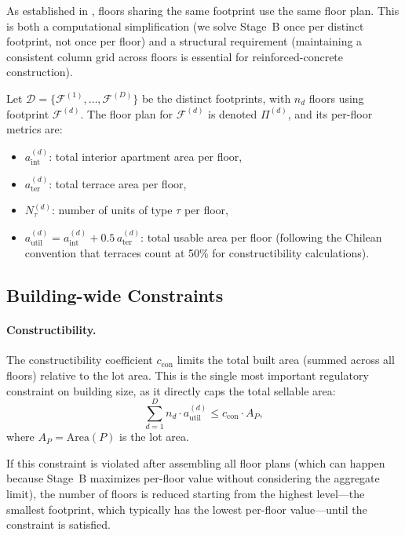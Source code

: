 \documentclass[11pt,a4paper]{article}
\newcommand{\calF}{\mathcal{F}}
\begin{document}
As established in , floors sharing the same footprint
use the same floor plan. This is both a computational simplification
(we solve Stage~B once per distinct footprint, not once per floor) and
a structural requirement (maintaining a consistent column grid across
floors is essential for reinforced-concrete construction).

Let $\mathcal{D} = \{\calF^{(1)}, \ldots, \calF^{(D)}\}$ be the distinct
footprints, with $n_d$ floors using footprint $\calF^{(d)}$. The floor
plan for $\calF^{(d)}$ is denoted $\Pi^{(d)}$, and its per-floor
metrics are:
\begin{itemize}[nosep]
    \item $a_{\text{int}}^{(d)}$: total interior apartment area per floor,
    \item $a_{\text{ter}}^{(d)}$: total terrace area per floor,
    \item $N_{\tau}^{(d)}$: number of units of type $\tau$ per floor,
    \item $a_{\text{util}}^{(d)} = a_{\text{int}}^{(d)} + 0.5\,a_{\text{ter}}^{(d)}$: total usable area per floor (following the Chilean convention that terraces count at 50\% for constructibility calculations).
\end{itemize}

\subsection{Building-wide Constraints}

\paragraph{Constructibility.}
The constructibility coefficient $c_{\text{con}}$ limits the total
built area (summed across all floors) relative to the lot area. This
is the single most important regulatory constraint on building size,
as it directly caps the total sellable area:
\begin{equation}\label{eq:constructibility}
    \sum_{d=1}^{D} n_d \cdot a_{\text{util}}^{(d)} \leq c_{\text{con}} \cdot A_P,
\end{equation}
where $A_P = \text{Area}(P)$ is the lot area.

If this constraint is violated after assembling all floor plans (which
can happen because Stage~B maximizes per-floor value without considering
the aggregate limit), the number of floors is reduced starting from the
highest level---the smallest footprint, which typically has the lowest
per-floor value---until the constraint is satisfied.
\end{document}
